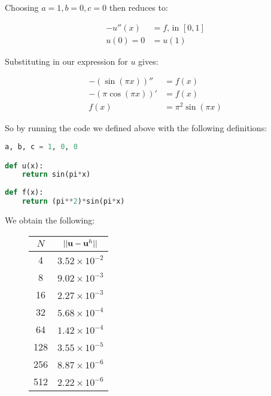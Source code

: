 Choosing $a = 1, b = 0, c = 0$ then  reduces to:

\begin{align*}
	-u''(x) &= f \text{,  in } [0,1] \\ 
    u(0) = 0 &= u(1)
\end{align*}

Substituting in our expression for $u$ gives:

\begin{align*}
	-(\sin{(\pi x)})'' &= f(x) \\
    -(\pi\cos{(\pi x)})' &= f(x) \\
    f(x) &= \pi^2\sin{(\pi x)} 
\end{align*}

So by running the code we defined above with the following definitions:

\begin{lstlisting}[language=Python]
a, b, c = 1, 0, 0

def u(x):
	return sin(pi*x)
    
def f(x):
	return (pi**2)*sin(pi*x)
\end{lstlisting}

We obtain the following:

\begin{figure}
\centering
\begin{minipage}{.5\textwidth}
	\centering
    \begin{tabular}{| c | c |} \hline
		$N$ & $||\mathbf{u} - \mathbf{u}^h||$ \\ \hline
        4 & $3.52\times10^{-2}$ \\ 
        8 & $9.02\times10^{-3}$ \\
        16 & $2.27\times10^{-3}$ \\ 
        32 & $5.68\times10^{-4}$ \\ 
        64 & $1.42\times10^{-4}$ \\ 
        128 & $3.55\times10^{-5}$ \\ 
        256 & $8.87\times10^{-6}$ \\ 
        512 & $2.22\times10^{-6}$ \\ \hline
    \end{tabular}
\end{minipage}
\begin{minipage}{.5\textwidth}
	\centering
\end{minipage}
\end{figure}